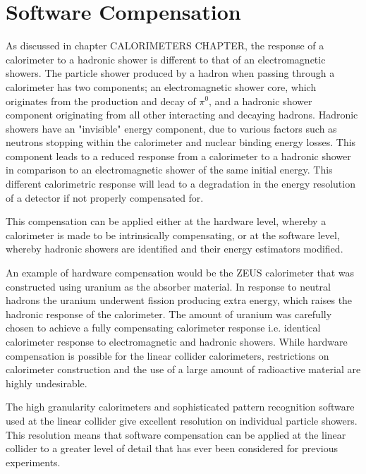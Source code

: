 
\section{Software Compensation}
\label{sec:softcomp}
As discussed in chapter CALORIMETERS CHAPTER, the response of a calorimeter to a hadronic shower is different to that of an electromagnetic showers.  The particle shower produced by a hadron when passing through a calorimeter has two components; an electromagnetic shower core, which originates from the production and decay of $\pi^{0}$, and a hadronic shower component originating from all other interacting and decaying hadrons.  Hadronic showers have an "invisible" energy component, due to various factors such as neutrons stopping within the calorimeter and nuclear binding energy losses.  This component leads to a reduced response from a calorimeter to a hadronic shower in comparison to an electromagnetic shower of the same initial energy.  This different calorimetric response will lead to a degradation in the energy resolution of a detector if not properly compensated for. 

This compensation can be applied either at the hardware level, whereby a calorimeter is made to be intrinsically compensating, or at the software level, whereby hadronic showers are identified and their energy estimators modified.  

An example of hardware compensation would be the ZEUS calorimeter \cite{Derrick:1991tq} that was constructed using uranium as the absorber material.  In response to neutral hadrons the uranium underwent fission producing extra energy, which raises the hadronic response of the calorimeter.  The amount of uranium was carefully chosen to achieve a fully compensating calorimeter response i.e. identical calorimeter response to electromagnetic and hadronic showers.  While hardware compensation is possible for the linear collider calorimeters, restrictions on calorimeter construction and the use of a large amount of radioactive material are highly undesirable.  

The high granularity calorimeters and sophisticated pattern recognition software used at the linear collider give excellent resolution on individual particle showers.  This resolution means that software compensation can be applied at the linear collider to a greater level of detail that has ever been considered for previous experiments.  

